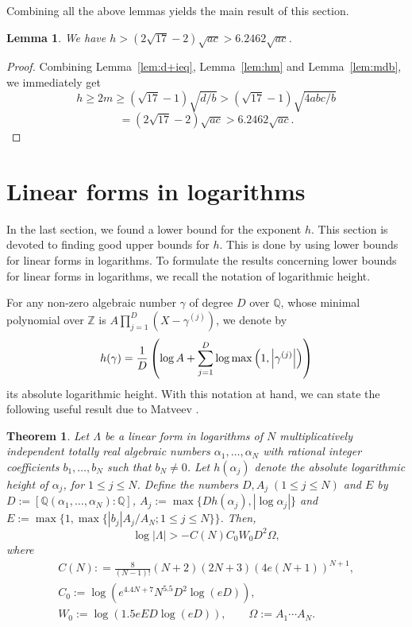 \documentclass{amsart}
\newtheorem{theorem}{Theorem}
\newtheorem{lemma}{Lemma}
\theoremstyle{definition}
\newcommand{\klammern}[4][]%
{\ifthenelse{\equal{#1}{}}{\left#2}{\csname#1\endcsname#2}%
#4\ifthenelse{\equal{#1}{}}{\right#3}{\csname#1\endcsname#3}}
\newcommand{\betrag}[2][]{\klammern[#1]{\lvert}{\rvert}{#2}}
\newcommand{\conj}[1]{^{(#1)}}
\def\QQ{\mathbb Q}
\begin{document}
Combining all the above lemmas yields the main result of this section.

\begin{lemma}\label{lem:hbd}
We have $h>(2\sqrt{17}-2)\sqrt{ac}>6.2462\sqrt{ac}$. 
\end{lemma}

\begin{proof}
Combining Lemma~\ref{lem:d+ieq}, Lemma~\ref{lem:hm} and Lemma~\ref{lem:mdb}, we immediately get
$$
h\ge 2m \ge (\sqrt{17}-1)\sqrt{d/b} > (\sqrt{17}-1)\sqrt{4abc/b} 
$$ 
$$
=(2\sqrt{17}-2)\sqrt{ac}>6.2462\sqrt{ac}.
$$
\end{proof}

\section{Linear forms in logarithms}\label{sec:6}

In the last section, we found a lower bound for the exponent $h$. This section is devoted to finding good
upper bounds for $h$. This is done by using lower bounds for linear forms in logarithms. To formulate 
the results concerning lower bounds for linear forms in logarithms, we recall the notation of
logarithmic height.

For any non-zero algebraic number $\gamma$ of degree $D$
over $\mathbb{Q}$, whose minimal polynomial over $\mathbb{Z}$ is $A\prod_{j=1}^D
\left(X-\gamma^{( j)} \right)$, we denote by
$$
h(\gamma) = \frac{1}{D} \left( \log A + \sum_{j=1}^D
\log\max\left(1, \betrag{\gamma\conj j}\right)\right)
$$
its absolute logarithmic height. With this notation at hand, we can state the following useful
result due to Matveev \cite{Matveev:2000}.

\begin{theorem}\label{thm:Matveev}
Let $\Lambda$ be a linear form in logarithms of $N$ multiplicatively independent totally real algebraic
numbers $\alpha_1,\ldots, \alpha_N$ with rational integer coefficients $b_1, \ldots, b_N$ such that $b_N  \neq 0$.
Let $h(\alpha_j)$ denote the absolute logarithmic height of $\alpha_j$, for $1\le j \le N$.
Define the numbers $D,A_j\; (1\le j \le N)$ and $E$ by 
$D:=[\mathbb{Q}(\alpha_1,\ldots, \alpha_{N}):\QQ]$, $A_j := \max\{ Dh(\alpha_j), |\log \alpha_j|\}$ and $E:=\max\{1, \max\{|b_j| A_j/A_N; 1\le j \le N\}\}$. Then,   
$$
\log |\Lambda| > - C(N) C_0 W_0 D^2 \Omega,  
$$
where 
\begin{gather*}
C(N): = \frac{8}{(N-1)!} (N+2) (2N+3)(4e(N+1))^{N+1},\\  
C_0 := \log (e^{4.4N+7} N^{5.5} D^2 \log(eD)),\\
W_0 := \log (1.5eED\log(eD)),\qquad  \Omega := A_1\cdots A_N. 
\end{gather*}
\end{theorem}
\end{document}
